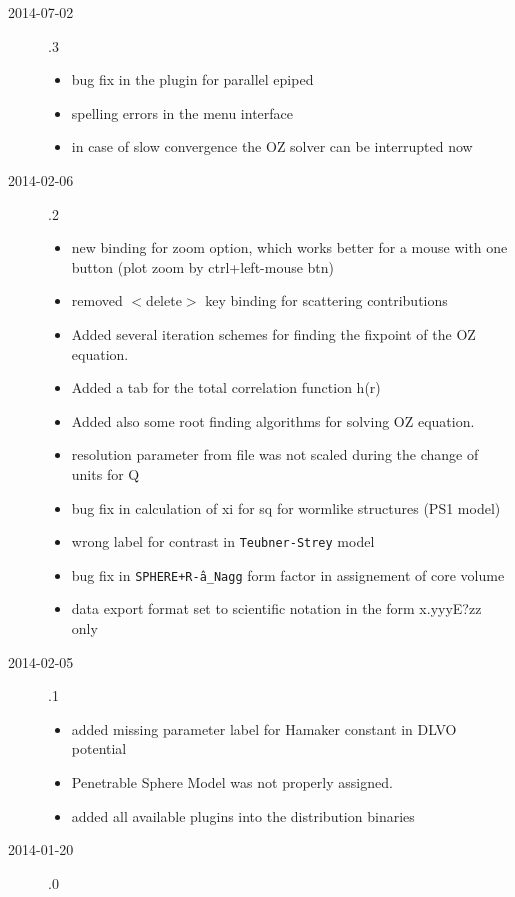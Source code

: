 \begin{description}
\begin{itemize}
    \end{itemize}
    \item[2014-07-02] .3
    \begin{itemize}
        \item bug fix in the plugin for parallel epiped
        \item spelling errors in the menu interface
        \item in case of slow convergence the OZ solver can be interrupted now
    \end{itemize}
    \item[2014-02-06] .2
    \begin{itemize}
        \item new binding for zoom option, which works better for a mouse with one button
              (plot zoom by ctrl+left-mouse btn)
        \item removed $<$delete$>$ key binding for scattering contributions
        \item Added several iteration schemes for finding the fixpoint of the OZ equation.
        \item Added a tab for the total correlation function h(r)
        \item Added also some root finding algorithms for solving OZ equation.
        \item resolution parameter from file was not scaled during the change of units for Q
        \item bug fix in calculation of xi for sq for wormlike structures  (PS1 model)
        \item wrong label for contrast in \texttt{Teubner-Strey} model
        \item bug fix in \texttt{SPHERE+R\^-a\_Nagg} form factor in assignement of core volume
        \item data export format set to scientific notation in the form x.yyyE?zz only
    \end{itemize}
    \item[2014-02-05] .1
    \begin{itemize}
      \item added missing parameter label for Hamaker constant in DLVO potential
      \item Penetrable Sphere Model was not properly assigned.
      \item added all available plugins into the distribution binaries
    \end{itemize}
    \item[2014-01-20] .0

\end{description}
